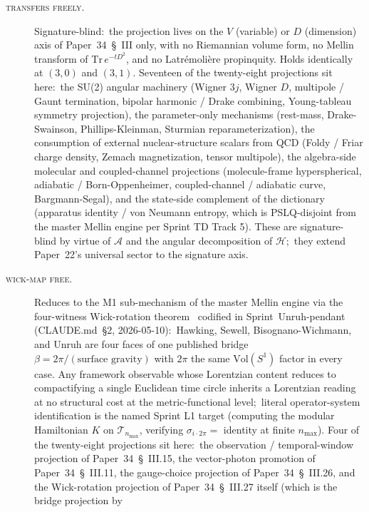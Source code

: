 \documentclass[twocolumn,pra,amsmath,amssymb,superscriptaddress]{revtex4-2}
\begin{document}
\begin{description}
\item[\textsc{transfers freely}.]  Signature-blind:\ the projection
  lives on the $V$ (variable) or $D$ (dimension) axis of
  Paper~34~\S~III only, with no Riemannian volume form, no Mellin
  transform of $\mathrm{Tr}\,e^{-tD^2}$, and no
  Latr\'emoli\`ere propinquity.  Holds identically at $(3, 0)$ and
  $(3, 1)$.  Seventeen of the twenty-eight projections sit here:\ the
  SU(2) angular machinery (Wigner $3j$, Wigner $D$, multipole / Gaunt
  termination, bipolar harmonic / Drake combining, Young-tableau
  symmetry projection), the parameter-only mechanisms (rest-mass,
  Drake-Swainson, Phillips-Kleinman, Sturmian reparameterization), the
  consumption of external nuclear-structure scalars from QCD (Foldy /
  Friar charge density, Zemach magnetization, tensor multipole), the
  algebra-side molecular and coupled-channel projections (molecule-frame
  hyperspherical, adiabatic / Born-Oppenheimer, coupled-channel /
  adiabatic curve, Bargmann-Segal), and the state-side complement of
  the dictionary (apparatus identity / von Neumann entropy, which is
  PSLQ-disjoint from the master Mellin engine per Sprint TD Track 5).
  These are signature-blind by virtue of $\mathcal{A}$ and the angular
  decomposition of $\mathcal{H}$;\ they extend Paper~22's universal
  sector to the signature axis.
\item[\textsc{wick-map free}.]  Reduces to the M1 sub-mechanism of the
  master Mellin engine via the four-witness Wick-rotation
  theorem~\cite{hartle_hawking1976, sewell1982,
    bisognano_wichmann1976, unruh1976} codified in
  Sprint~Unruh-pendant (CLAUDE.md~\S2, 2026-05-10):\ Hawking, Sewell,
  Bisognano-Wichmann, and Unruh are four faces of one published
  bridge $\beta = 2\pi / (\text{surface gravity})$ with $2\pi$ the
  same $\mathrm{Vol}(S^1)$ factor in every case.  Any framework
  observable whose Lorentzian content reduces to compactifying a
  single Euclidean time circle inherits a Lorentzian reading at no
  structural cost at the metric-functional level;\ literal
  operator-system identification is the named Sprint L1 target
  (computing the modular Hamiltonian $K$ on $\mathcal{T}_{n_{\max}}$,
  verifying $\sigma_{i \cdot 2\pi} = $ identity at finite $n_{\max}$).
  Four of the twenty-eight projections sit here:\ the observation /
  temporal-window projection of Paper~34~\S~III.15, the vector-photon
  promotion of Paper~34~\S~III.11, the gauge-choice projection of
  Paper~34~\S~III.26, and the Wick-rotation projection of
  Paper~34~\S~III.27 itself (which is the bridge projection by

\end{description}
\end{document}
